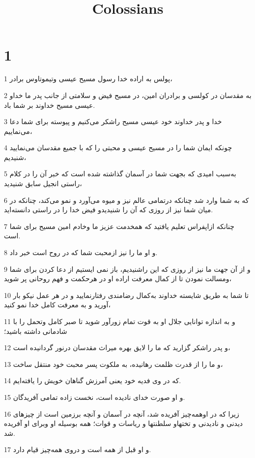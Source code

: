 

\title{Colossians}


\chapter{1}

\par 1 پولس به اراده خدا رسول مسیح عیسی وتیموتاوس برادر،
\par 2 به مقدسان در کولسی و برادران امین، در مسیح فیض و سلامتی از جانب پدر ما خداو عیسی مسیح خداوند بر شما باد.
\par 3 خدا و پدر خداوند خود عیسی مسیح راشکر می‌کنیم و پیوسته برای شما دعا می‌نماییم،
\par 4 چونکه ایمان شما را در مسیح عیسی و محبتی را که با جمیع مقدسان می‌نمایید شنیدیم،
\par 5 به‌سبب امیدی که بجهت شما در آسمان گذاشته شده است که خبر آن را در کلام راستی انجیل سابق شنیدید،
\par 6 که به شما وارد شد چنانکه درتمامی عالم نیز و میوه می‌آورد و نمو می‌کند، چنانکه در میان شما نیز از روزی که آن را شنیدیدو فیض خدا را در راستی دانسته‌اید.
\par 7 چنانکه ازاپفراس تعلیم یافتید که همخدمت عزیز ما وخادم امین مسیح برای شما است.
\par 8 و او ما را نیز ازمحبت شما که در روح است خبر داد.
\par 9 و از آن جهت ما نیز از روزی که این راشنیدیم، باز نمی ایستیم از دعا کردن برای شما ومسالت نمودن تا از کمال معرفت اراده او در هرحکمت و فهم روحانی پر شوید،
\par 10 تا شما به طریق شایسته خداوند به‌کمال رضامندی رفتارنمایید و در هر عمل نیکو بار آورید و به معرفت کامل خدا نمو کنید،
\par 11 و به اندازه توانایی جلال او به قوت تمام زورآور شوید تا صبر کامل وتحمل را با شادمانی داشته باشید؛
\par 12 و پدر راشکر گزارید که ما را لایق بهره میراث مقدسان درنور گردانیده است،
\par 13 و ما را از قدرت ظلمت رهانیده، به ملکوت پسر محبت خود منتقل ساخت،
\par 14 که در وی فدیه خود یعنی آمرزش گناهان خویش را یافته‌ایم.
\par 15 و او صورت خدای نادیده است، نخست زاده تمامی آفریدگان.
\par 16 زیرا که در اوهمه‌چیز آفریده شد، آنچه در آسمان و آنچه برزمین است از چیزهای دیدنی و نادیدنی و تختهاو سلطنتها و ریاسات و قوات؛ همه بوسیله او وبرای او آفریده شد.
\par 17 و او قبل از همه است و دروی همه‌چیز قیام دارد.
